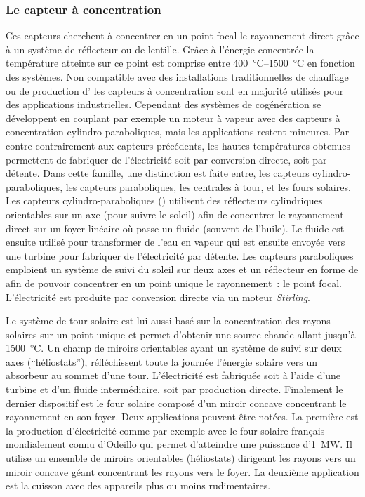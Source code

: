 \subsubsection{Le capteur à concentration} %
\label{ssub:le_capteur_a_concentration}
Ces capteurs cherchent à concentrer en un point focal le rayonnement direct grâce à un
système de réflecteur ou de lentille. Grâce à l’énergie concentrée la température
atteinte sur ce point est comprise entre \SIrange{400}{1500}{\celsius} en fonction des
systèmes. Non compatible avec des installations traditionnelles de chauffage ou de production
d’ les capteurs à concentration sont en majorité utilisés pour des applications
industrielles. Cependant des systèmes de cogénération se développent en couplant
par exemple un moteur à vapeur avec des capteurs à concentration cylindro-paraboliques,
mais les applications restent mineures.
Par contre contrairement aux capteurs précédents, les hautes températures obtenues
permettent de fabriquer de l’électricité soit par conversion directe, soit par détente.
Dans cette famille, une distinction est faite entre, les capteurs cylindro-paraboliques, les capteurs
paraboliques, les centrales à tour, et les fours solaires. Les capteurs cylindro-paraboliques
() utilisent des réflecteurs
cylindriques orientables sur un axe (pour suivre le soleil) afin de concentrer le
rayonnement direct sur un foyer linéaire où passe un fluide (souvent de l’huile). Le fluide
est ensuite utilisé pour transformer de l’eau en vapeur qui est ensuite envoyée vers une turbine pour fabriquer de l’électricité par détente.
Les capteurs paraboliques emploient un système de suivi du soleil sur deux axes et un
réflecteur en forme de  afin de pouvoir concentrer en un point unique le rayonnement~: le point focal.
L’électricité est produite par conversion directe via un moteur \textit{Stirling}.

Le système de tour solaire est lui aussi basé sur la concentration des rayons solaires sur
un point unique et permet d’obtenir une source chaude allant jusqu’à
\SI{1500}{\celsius}. Un champ de miroirs orientables ayant un système de suivi sur deux axes
(\enquote{héliostats}), réfléchissent toute la journée l’énergie solaire vers un absorbeur au
sommet d’une tour.
L’électricité est fabriquée soit à l’aide d’une turbine et d’un fluide intermédiaire, soit par
production directe. Finalement le dernier dispositif est le four solaire composé d’un
miroir concave concentrant le rayonnement en son foyer. Deux applications peuvent être
notées. La première est la production d’électricité comme par exemple avec le four solaire
français mondialement connu d’\href{http://www.promes.cnrs.fr/index.php?page=historique}{Odeillo} qui permet
d’atteindre une puissance d’\SI{1}{\mega\watt}. Il utilise un ensemble de miroirs
orientables (héliostats) dirigeant les rayons vers un miroir concave géant concentrant les
rayons vers le foyer. La deuxième application est la cuisson avec des appareils plus ou
moins rudimentaires.


